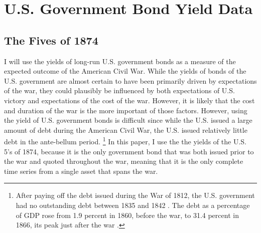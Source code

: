 \section{U.S. Government Bond Yield Data}
\label{bonds_battles:sec:why-prices-study}



\subsection{The Fives of 1874}
\label{bonds_battles:sec:5s-1874}

I will use the yields of long-run U.S. government bonds as a measure of the expected outcome of the American Civil War.
While the yields of bonds of the U.S. government are almost certain to have been primarily driven by expectations of the war, they could plausibly be influenced by both expectations of U.S. victory and expectations of the cost of the war.
However, it is likely that the cost and duration of the war is the more important of those factors.
However, using the yield of U.S. government bonds is difficult since while the U.S. issued a large amount of debt during the American Civil War, the U.S. issued relatively little debt in the ante-bellum period.%
\footnote{
  After paying off the debt issued during the War of 1812, the U.S. government had no outstanding debt between 1835 and 1842 \parencite[297]{HomerSylla2005}.
  The debt as a percentage of GDP rose from 1.9 percent in 1860, before the war, to 31.4 percent in 1866, its peak just after the war \parencites{CBO2012}{CBO2012a}.
}
In this paper, I use the the yields of the U.S. 5's of 1874, because it is the only government bond that was both issued prior to the war and quoted throughout the war, meaning that it is the only complete time series from a single asset that spans the war.

